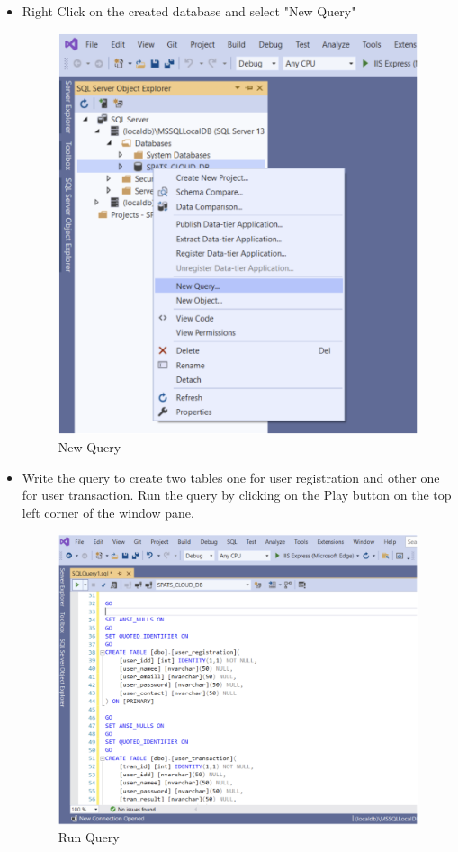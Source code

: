 \documentclass[10pt]{article}
\begin{document}
\begin{itemize}
\item Right Click on the created database and select "New Query"
\begin{figure}[H]
    \begin{center}
        \includegraphics[width=0.7\linewidth, frame]{CA2-template/CM13.png}
       \caption{New Query \label{fig:5}}
    \end{center}
\end{figure}

\item Write the query to create two tables one for user registration and other one for user transaction. Run the query by clicking on the Play button on the top left corner of the window pane.
\begin{figure}[H]
    \begin{center}
        \includegraphics[width=0.7\linewidth, frame]{CA2-template/CM14.png}
       \caption{Run Query \label{fig:6}}
    \end{center}
\end{figure}


\end{itemize}
\end{document}
